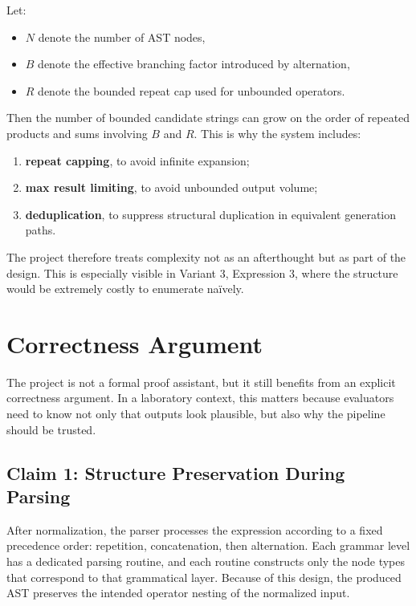 \documentclass[a4paper,12pt]{article}
\begin{document}
Let:

\begin{itemize}
    \item $N$ denote the number of AST nodes,
    \item $B$ denote the effective branching factor introduced by alternation,
    \item $R$ denote the bounded repeat cap used for unbounded operators.
\end{itemize}

Then the number of bounded candidate strings can grow on the order of repeated products and sums involving $B$ and $R$. This is why the system includes:

\begin{enumerate}[label=\arabic*.]
    \item \textbf{repeat capping}, to avoid infinite expansion;
    \item \textbf{max result limiting}, to avoid unbounded output volume;
    \item \textbf{deduplication}, to suppress structural duplication in equivalent generation paths.
\end{enumerate}

The project therefore treats complexity not as an afterthought but as part of the design. This is especially visible in Variant 3, Expression 3, where the structure would be extremely costly to enumerate naïvely.

\section{Correctness Argument}

The project is not a formal proof assistant, but it still benefits from an explicit correctness argument. In a laboratory context, this matters because evaluators need to know not only that outputs look plausible, but also why the pipeline should be trusted.

\subsection{Claim 1: Structure Preservation During Parsing}

After normalization, the parser processes the expression according to a fixed precedence order: repetition, concatenation, then alternation. Each grammar level has a dedicated parsing routine, and each routine constructs only the node types that correspond to that grammatical layer. Because of this design, the produced AST preserves the intended operator nesting of the normalized input.
\end{document}
